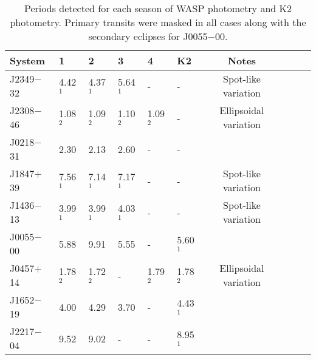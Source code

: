 \begin{table}
\caption{Periods detected for each season of WASP photometry and K2 photometry. Primary transits were masked in all cases along with the secondary eclipses for J0055$-$00.  }              %
\label{results:table:rot_mod}      %
\centering                                      %
\begin{tabular}{l l l l l l c c c c}          %
\hline\hline                        %
System & 1 & 2 & 3 & 4 & K2 & Notes \\
\hline
J2349$-$32 & 4.42$^1$ & 4.37$^1$ & 5.64$^1$ & - & - & Spot-like variation \\
J2308$-$46 & 1.08$^2$ & 1.09$^2$ & 1.10$^2$ & 1.09$^2$ & - & Ellipsoidal variation \\
J0218$-$31 & 2.30 & 2.13 & 2.60 & - & - \\
J1847$+$39 & 7.56$^1$ & 7.14$^1$ & 7.17$^1$ & - & - & Spot-like variation \\
J1436$-$13 & 3.99$^1$ & 3.99$^1$ & 4.03$^1$ & - & - & Spot-like variation \\
\hline    
J0055$-$00 & 5.88 & 9.91 & 5.55  & - & 5.60$^1$ \\
J0457$+$14 & 1.78$^2$ & 1.72$^2$  & - & 1.79$^2$ & 1.78$^2$ & Ellipsoidal variation  \\
J1652$-$19 & 4.00 & 4.29 & 3.70  & - & 4.43$^1$ \\
J2217$-$04 & 9.52 & 9.02 & - & -  & 8.95$^1$ \\

\hline                                             %
\end{tabular}
\end{table}